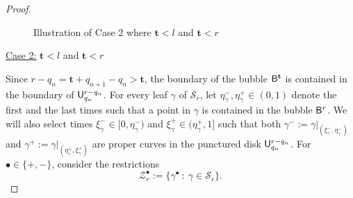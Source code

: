 \documentclass{amsart}
\begin{document}
\begin{proof}
\begin{figure}
    \caption{Illustration of Case 2 where ${\mathbf{t}}<l$ and ${\mathbf{t}}<r$}
    \label{fig:case-2}
\end{figure}

    \noindent \underline{Case 2:} ${\mathbf{t}}<l$ and ${\mathbf{t}}<r$
    \vspace{0.05in}
    
    Since $r-q_{n} = {\mathbf{t}} + q_{n+1}-q_{n} > {\mathbf{t}}$, the boundary of the bubble $\mathsf{B}^{\mathbf{t}}$ is contained in the boundary of $\mathsf{U}^{r-q_{n}}_{q_{n}}$. 
    For every leaf $\gamma$ of $\mathcal{S}_r$, let $\eta^-_\gamma, \eta^+_\gamma \in (0,1)$ denote the first and the last times such that a point in $\gamma$ is contained in the bubble $\mathsf{B}^r$. 
    We will also select times $\xi^-_\gamma \in [0,\eta^-_\gamma)$ and $\xi^+_\gamma \in (\eta^+_\gamma,1]$ such that both $\gamma^- := \gamma|_{(\xi^-_\gamma,\eta^-_\gamma)}$ and $\gamma^+ :=\gamma|_{(\eta^+_\gamma,\xi^+_\gamma)}$ are proper curves in the punctured disk $\mathsf{U}^{r-q_{n}}_{q_{n}}$. 
    For $\bullet \in \{+,-\}$, consider the restrictions 
    \[
    \mathcal{Z}^\bullet_r := \{\gamma^\bullet \: : \: \gamma \in \mathcal{S}_r\}. 
    \]
    

\end{proof}
\end{document}
